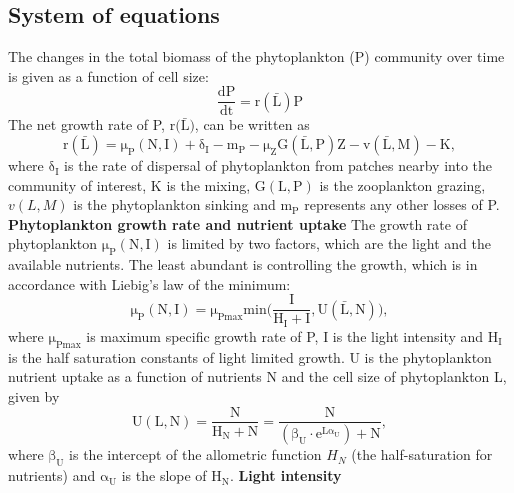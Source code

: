 \subsection{System of equations}
The changes in the total biomass of the phytoplankton (P) community over time is given as a function of cell size:
\begin{equation}
    \label{eq:phytoplanktonbiomass}
    \mathrm{\frac{dP}{dt} = r(\bar{L})P}
\end{equation}
The net growth rate of P, $\mathrm{r(\bar{L}})$, can be written as
\begin{equation}
    \label{eq:netgrowthrateP}
    \mathrm{r(\bar{L})=\mu_P(N,I)+\delta_I-m_P-\mu_ZG(\bar{L},P)Z-v(\bar{L},M)-K},
\end{equation}
where $\mathrm{\delta_I}$ is the rate of dispersal of phytoplankton from patches nearby into the community of interest, K is the mixing, $\mathrm{G(L,P)}$ is the zooplankton grazing, $v(L,M)$ is the phytoplankton sinking and $\mathrm{m_P}$ represents any other losses of P.
\newline
\newline
\textbf{Phytoplankton growth rate and nutrient uptake}
\newline
The growth rate of phytoplankton $\mathrm{\mu_P(N,I)}$ is limited by two factors, which are the light and the available nutrients. The least abundant is controlling the growth, which is in accordance with Liebig's law of the minimum:
\begin{equation}
    \label{eq:growthrate}
    \mathrm{\mu_P(N,I) = \mu_{Pmax}min\bigg(\frac{I}{H_I+I},U(\bar{L},N)\bigg)},
\end{equation}
where $\mathrm{\mu_{Pmax}}$ is maximum specific growth rate of P, I is the light intensity and $\mathrm{H_{I}}$ is the half saturation constants of light limited growth. U is the phytoplankton nutrient uptake as a function of nutrients N and the cell size of phytoplankton L, given by
\begin{equation}
    \label{eq:nutrientuptake}
    \mathrm{U(L,N) = \frac{N}{H_N+N}=\frac{N}{(\beta_U\cdot e^{L\alpha_U})+N}},
\end{equation}
where $\mathrm{\beta_U}$ is the intercept of the allometric function $H_N$ (the half-saturation for nutrients) and $\mathrm{\alpha_U}$ is the slope of $\mathrm{H_N}$.
\newline
\newline
\textbf{Light intensity}
\newline
